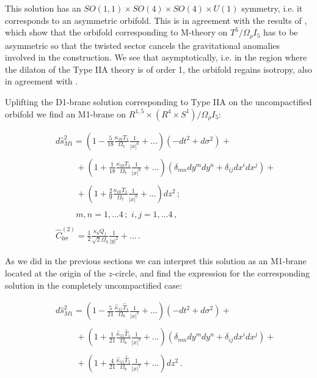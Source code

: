 \documentclass[12pt,a4paper]{article}
\begin{document}
\noindent This solution has an $SO(1,1)\times SO(4)\times SO(4)
\times U(1)$ symmetry, i.e. it corresponds to an asymmetric orbifold.
This is in agreement with the results
of \cite{DM,W}, which show that the orbifold corresponding to
M-theory on $T^5/\Omega_\rho I_5$
has to be asymmetric 
so that the twisted sector cancels the gravitational anomalies
involved in the construction. We see that asymptotically, 
i.e. in the region where the dilaton of the Type IIA theory is of
order 1, the orbifold regains isotropy, also in agreement with
\cite{DM,W}.  

Uplifting the D1-brane solution corresponding to Type IIA on the
uncompactified orbifold we find an M1-brane on $R^{1,5}\times 
(R^4\times S^1)/\Omega_\rho I_5$: 

\begin{eqnarray}
\label{M1}
&&d{\hat s}_{M1}^2=(1-\frac{5}{18} \frac{\kappa_{10}T_1}{\Omega_7}
\frac{1}{|x|^6}
+\dots)(-dt^2+d\sigma^2)+\nonumber\\
&&\nonumber\\
&&\hspace{1cm}+(1+\frac{1}{18} \frac{\kappa_{10}T_1}
{\Omega_7}\frac{1}{|x|^6}+\dots)\left(\delta_{mn}dy^m dy^n+\delta_{ij}
dx^idx^j\right)
 +\nonumber\\
&&\nonumber\\
&&\hspace{1cm}+(1+\frac29 \frac{\kappa_{10}T_1}{\Omega_7}
\frac{1}{|x|^6}+\dots)dz^2\, ;\nonumber\\
&&\nonumber\\
&&\hspace{1cm}m,n=1,\dots 4\, ;\,\,i,j=1,\dots 4\, ,\nonumber\\
& &\nonumber\\
&& {\hat C}^{(2)}_{0\sigma}=\frac12 \frac{\kappa_6 Q_1}{\sqrt{2}\Omega_3}
\frac{1}{|y|^2}+\dots \, .
\end{eqnarray}

\noindent As we did in the previous sections we can 
interpret this solution as an
M1-brane located at the origin of the $z$-circle, and find the
expression for the corresponding solution in the completely
uncompactified case:

\begin{eqnarray}
\label{M1unc}
&&d{\hat s}_{M1}^2=(1-\frac{5}{21} \frac{{\hat \kappa}_{11}{\hat T}_1}
{\Omega_8}\frac{1}{|x|^7}+\dots)(-dt^2+d\sigma^2)+\nonumber\\
&&\nonumber\\
&&\hspace{1cm}+(1+\frac{1}{21} \frac{{\hat \kappa}_{11}{\hat T}_1}
{\Omega_8}\frac{1}{|x|^7}+\dots)\left(\delta_{mn}dy^m dy^n+\delta_{ij}
dx^idx^j\right)+\\
&& \nonumber\\
&&\hspace{1cm}+(1+\frac{4}{21} \frac{{\hat \kappa}_{11}{\hat T}_1}
{\Omega_8}
\frac{1}{|x|^7}+\dots)dz^2\, .\nonumber
\end{eqnarray} 
 
\end{document}
